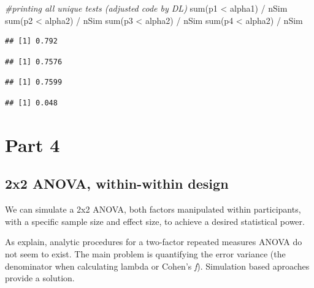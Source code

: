 \documentclass[
]{book}
\newenvironment{Shaded}{\begin{snugshade}}{\end{snugshade}}
\newcommand{\CommentTok}[1]{\textcolor[rgb]{0.56,0.35,0.01}{\textit{#1}}}
\newcommand{\FunctionTok}[1]{\textcolor[rgb]{0.00,0.00,0.00}{#1}}
\newcommand{\NormalTok}[1]{#1}
\newcommand{\SpecialCharTok}[1]{\textcolor[rgb]{0.00,0.00,0.00}{#1}}
\begin{document}
\begin{Shaded}
\begin{Highlighting}[]
\CommentTok{\#printing all unique tests (adjusted code by DL)}
\FunctionTok{sum}\NormalTok{(p1 }\SpecialCharTok{\textless{}}\NormalTok{ alpha1) }\SpecialCharTok{/}\NormalTok{ nSim}
\FunctionTok{sum}\NormalTok{(p2 }\SpecialCharTok{\textless{}}\NormalTok{ alpha2) }\SpecialCharTok{/}\NormalTok{ nSim}
\FunctionTok{sum}\NormalTok{(p3 }\SpecialCharTok{\textless{}}\NormalTok{ alpha2) }\SpecialCharTok{/}\NormalTok{ nSim}
\FunctionTok{sum}\NormalTok{(p4 }\SpecialCharTok{\textless{}}\NormalTok{ alpha2) }\SpecialCharTok{/}\NormalTok{ nSim}
\end{Highlighting}
\end{Shaded}

\begin{verbatim}
## [1] 0.792
\end{verbatim}

\begin{verbatim}
## [1] 0.7576
\end{verbatim}

\begin{verbatim}
## [1] 0.7599
\end{verbatim}

\begin{verbatim}
## [1] 0.048
\end{verbatim}

\newpage

\hypertarget{part-4}{%
\section{Part 4}\label{part-4}}

\hypertarget{x2-anova-within-within-design}{%
\subsection{2x2 ANOVA, within-within design}\label{x2-anova-within-within-design}}

We can simulate a 2x2 ANOVA, both factors manipulated within participants, with a specific sample size and effect size, to achieve a desired statistical power.

As \citet{potvin2000statistical} explain, analytic procedures for a two-factor repeated measures ANOVA do not seem to exist. The main problem is quantifying the error variance (the denominator when calculating lambda or Cohen's \emph{f}). Simulation based aproaches provide a solution.
\end{document}

